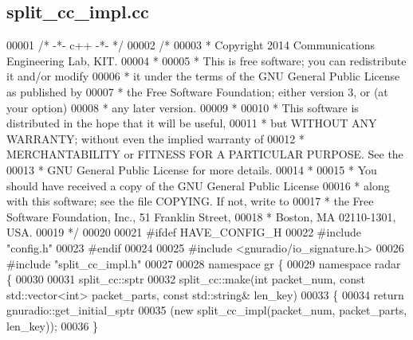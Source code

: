 \subsection{split\+\_\+cc\+\_\+impl.\+cc}
\label{split__cc__impl_8cc_source}

\begin{DoxyCode}
00001 \textcolor{comment}{/* -*- c++ -*- */}
00002 \textcolor{comment}{/*}
00003 \textcolor{comment}{ * Copyright 2014 Communications Engineering Lab, KIT.}
00004 \textcolor{comment}{ *}
00005 \textcolor{comment}{ * This is free software; you can redistribute it and/or modify}
00006 \textcolor{comment}{ * it under the terms of the GNU General Public License as published by}
00007 \textcolor{comment}{ * the Free Software Foundation; either version 3, or (at your option)}
00008 \textcolor{comment}{ * any later version.}
00009 \textcolor{comment}{ *}
00010 \textcolor{comment}{ * This software is distributed in the hope that it will be useful,}
00011 \textcolor{comment}{ * but WITHOUT ANY WARRANTY; without even the implied warranty of}
00012 \textcolor{comment}{ * MERCHANTABILITY or FITNESS FOR A PARTICULAR PURPOSE.  See the}
00013 \textcolor{comment}{ * GNU General Public License for more details.}
00014 \textcolor{comment}{ *}
00015 \textcolor{comment}{ * You should have received a copy of the GNU General Public License}
00016 \textcolor{comment}{ * along with this software; see the file COPYING.  If not, write to}
00017 \textcolor{comment}{ * the Free Software Foundation, Inc., 51 Franklin Street,}
00018 \textcolor{comment}{ * Boston, MA 02110-1301, USA.}
00019 \textcolor{comment}{ */}
00020 
00021 \textcolor{preprocessor}{#ifdef HAVE\_CONFIG\_H}
00022 \textcolor{preprocessor}{#include "config.h"}
00023 \textcolor{preprocessor}{#endif}
00024 
00025 \textcolor{preprocessor}{#include <gnuradio/io\_signature.h>}
00026 \textcolor{preprocessor}{#include "split_cc_impl.h"}
00027 
00028 \textcolor{keyword}{namespace }gr \{
00029   \textcolor{keyword}{namespace }radar \{
00030 
00031     split_cc::sptr
00032     split_cc::make(\textcolor{keywordtype}{int} packet\_num, \textcolor{keyword}{const} std::vector<int> packet\_parts, \textcolor{keyword}{const} 
      std::string& len\_key)
00033     \{
00034       \textcolor{keywordflow}{return} gnuradio::get\_initial\_sptr
00035         (\textcolor{keyword}{new} split_cc_impl(packet\_num, packet\_parts, len\_key));
00036     \}

\end{DoxyCode}
